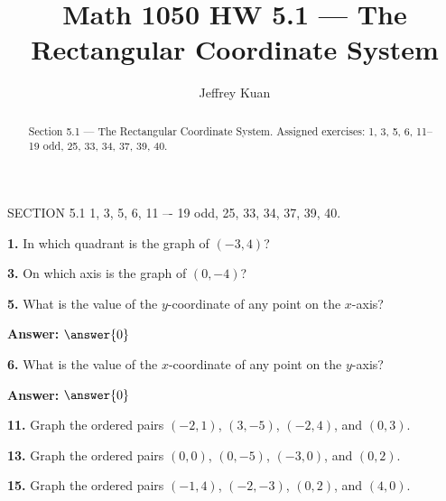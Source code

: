 \documentclass{ximera}
\author{Jeffrey Kuan}
\title{Math 1050 HW 5.1 --- The Rectangular Coordinate System}
\begin{document}
\begin{abstract}
    Section 5.1 --- The Rectangular Coordinate System.
    Assigned exercises: 1, 3, 5, 6, 11–19 odd, 25, 33, 34, 37, 39, 40.
\end{abstract}

\maketitle

SECTION 5.1 1, 3, 5, 6, 11 –- 19 odd, 25, 33, 34, 37, 39, 40.

\begin{problem}
\textbf{1.} In which quadrant is the graph of $(-3, 4)$?

\begin{multipleChoice}
\end{multipleChoice}
\end{problem}

\begin{problem}
\textbf{3.} On which axis is the graph of $(0, -4)$?

\begin{multipleChoice}
\end{multipleChoice}
\end{problem}

\begin{problem}
\textbf{5.} What is the value of the $y$-coordinate of any point on the $x$-axis?

\textbf{Answer:} $\answer{0}$
\end{problem}

\begin{problem}
\textbf{6.} What is the value of the $x$-coordinate of any point on the $y$-axis?

\textbf{Answer:} $\answer{0}$
\end{problem}

\begin{problem}
\textbf{11.} Graph the ordered pairs $(-2, 1)$, $(3, -5)$, $(-2, 4)$, and $(0, 3)$.
  \figbox{\gridsm}
\end{problem}

\begin{problem}
\textbf{13.} Graph the ordered pairs $(0, 0)$, $(0, -5)$, $(-3, 0)$, and $(0, 2)$.
  \figbox{\gridsm}
\end{problem}

\begin{problem}
\textbf{15.} Graph the ordered pairs $(-1, 4)$, $(-2, -3)$, $(0, 2)$, and $(4, 0)$.
  \figbox{\gridsm}
\end{problem}
\end{document}
